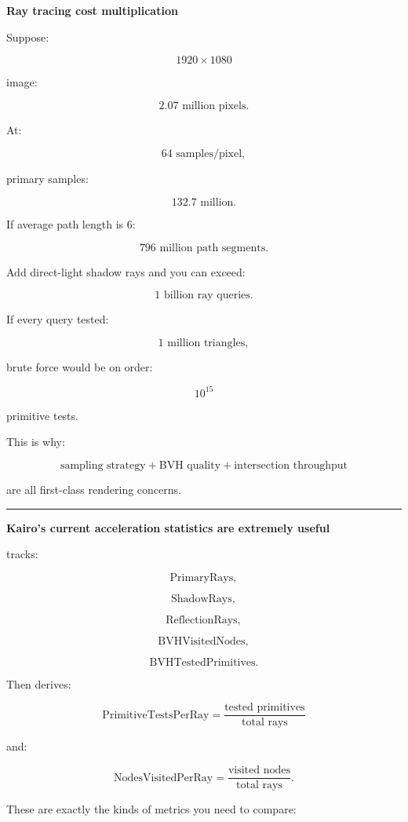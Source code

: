 \textbf{Ray tracing cost multiplication}

Suppose:

\[
1920\times1080
\]

image:

\[
2.07\text{ million pixels}.
\]

At:

\[
64\text{ samples/pixel},
\]

primary samples:

\[
132.7\text{ million}.
\]

If average path length is 6:

\[
796\text{ million path segments}.
\]

Add direct-light shadow rays and you can exceed:

\[
1\text{ billion ray queries}.
\]

If every query tested:

\[
1\text{ million triangles},
\]

brute force would be on order:

\[
10^{15}
\]

primitive tests.

This is why:

\[
\boxed{
\text{sampling strategy}
+
\text{BVH quality}
+
\text{intersection throughput}
}
\]

are all first-class rendering concerns.

\begin{center}\rule{0.5\linewidth}{0.5pt}\end{center}

\textbf{Kairo's current acceleration statistics are extremely useful}

 tracks:

\[
\text{PrimaryRays},
\]

\[
\text{ShadowRays},
\]

\[
\text{ReflectionRays},
\]

\[
\text{BVHVisitedNodes},
\]

\[
\text{BVHTestedPrimitives}.
\]

Then derives:

\[
\boxed{
\text{PrimitiveTestsPerRay}
=
\frac{
\text{tested primitives}
}{
\text{total rays}
}
}
\]

and:

\[
\boxed{
\text{NodesVisitedPerRay}
=
\frac{
\text{visited nodes}
}{
\text{total rays}
}.
}
\]

These are exactly the kinds of metrics you need to compare:

